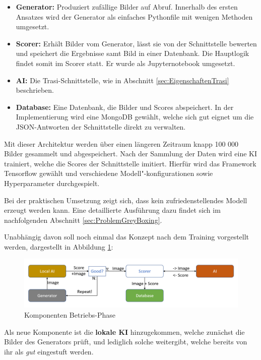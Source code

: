 \begin{itemize}
	\item \textbf{Generator:} Produziert zufällige Bilder auf Abruf. Innerhalb des ersten Ansatzes wird der Generator als einfaches Pythonfile mit wenigen Methoden umgesetzt.
	\item \textbf{Scorer:} Erhält Bilder vom Generator, lässt sie von der Schnittstelle bewerten und speichert die Ergebnisse samt Bild in einer Datenbank. Die Hauptlogik findet somit im Scorer statt. Er wurde als Jupyternotebook umgesetzt.
	\item \textbf{\ac{AI}:} Die Trasi-Schnittstelle, wie in Abschnitt \ref{sec:EigenschaftenTrasi} beschrieben.
	\item \textbf{Database:} Eine Datenbank, die Bilder und Scores abspeichert.
	In der Implementierung wird eine MongoDB gewählt, welche sich gut eignet um die JSON-Antworten der Schnittstelle direkt zu verwalten. 
\end{itemize}

Mit dieser Architektur werden über einen längeren Zeitraum knapp 100 000 Bilder gesammelt und abgespeichert. Nach der Sammlung der Daten wird eine \ac{KI} trainiert, welche die Scores der Schnittstelle imitiert. Hierfür wird das Framework Tensorflow gewählt und verschiedene Modell"-konfigurationen sowie Hyperparameter durchgespielt. 

Bei der praktischen Umsetzung zeigt sich, dass kein zufriedenstellendes Modell erzeugt werden kann. Eine detaillierte Ausführung dazu findet sich im nachfolgenden Abschnitt \ref{sec:ProblemGreyBoxing}.

Unabhängig davon soll noch einmal das Konzept nach dem Training vorgestellt werden, dargestellt in Abbildung \ref{fig:greyboxingrunning}: 
 \begin{figure}[h]
 	\centering
 	\includegraphics[width=0.9\linewidth]{Images/GreyBoxingRunning}
 	\caption{Komponenten Betriebs-Phase}
 	\label{fig:greyboxingrunning}
 \end{figure}
 Als neue Komponente ist die \textbf{lokale \ac{KI}} hinzugekommen, welche zunächst die Bilder des Generators prüft, und lediglich solche weitergibt, welche bereits von ihr als \textit{gut} eingestuft werden. 
 
